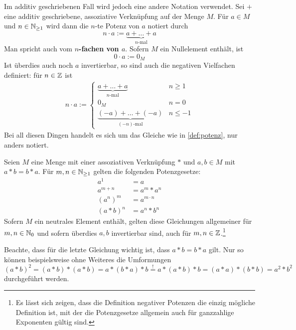     
\begin{nota}
    Im additiv geschriebenen Fall wird jedoch eine andere Notation verwendet. Sei $+$ eine additiv geschriebene, assoziative Verknüpfung auf der Menge $M$. Für $a\in M$ und $n\in \mathbb N_{\ge 1}$ wird dann die $n$-te Potenz von $a$ notiert durch
        \[ n \cdot a := \underbrace{a + \ldots + a}_{n\text{-mal}} \]
    Man spricht auch vom \textbf{$n$-fachen von $a$}. Sofern $M$ ein Nullelement enthält, ist
        \[ 0\cdot a := 0_M \]
    Ist überdies auch noch $a$ invertierbar, so sind auch die negativen Vielfachen definiert: für $n\in \mathbb Z$ ist
    \begin{align*}
        n \cdot a := \begin{cases}
            \underbrace{a+ \ldots + a}_{n\text{-mal}} & n \ge 1 \\
            0_M & n= 0 \\
            \underbrace{(-a) + \ldots +  (-a)}_{(-n)\text{-mal}} & n \le -1
        \end{cases}
    \end{align*}
    Bei all diesen Dingen handelt es sich um das Gleiche wie in \cref{def:potenz}, nur anders notiert.
\end{nota}


\begin{satz}[* Potenzgesetze] \label{potenzgesetze}
    Seien $M$ eine Menge mit einer assoziativen Verknüpfung $*$ und $a,b\in M$ mit $a*b=b*a$. Für $m,n\in \mathbb N_{\ge 1}$ gelten die folgenden Potenzgesetze:
    \begin{align*}
        a^1 & = a \\
        a^{m+n} & = a^m* a^n \\
        (a^n)^m & = a^{m\cdot n} \\
        (a*b)^n &= a^n*b^n
    \end{align*}
    Sofern $M$ ein neutrales Element enthält, gelten diese Gleichungen allgemeiner für $m,n\in \mathbb N_0$ und sofern überdies $a,b$ invertierbar sind, auch für $m,n\in \mathbb Z$.\footnote{Es lässt sich zeigen, dass die Definition negativer Potenzen die einzig mögliche Definition ist, mit der die Potenzgesetze allgemein auch für ganzzahlige Exponenten gültig sind.}
\end{satz}


\noindent Beachte, dass für die letzte Gleichung wichtig ist, dass $a*b=b*a$ gilt. Nur so können beispielsweise ohne Weiteres die Umformungen
    \[ (a*b)^2 = (a*b)*(a*b) = a*(b*a)*b \overset{!}{=} a*(a*b)*b = (a*a)*(b*b) = a^2*b^2 \]
durchgeführt werden.


